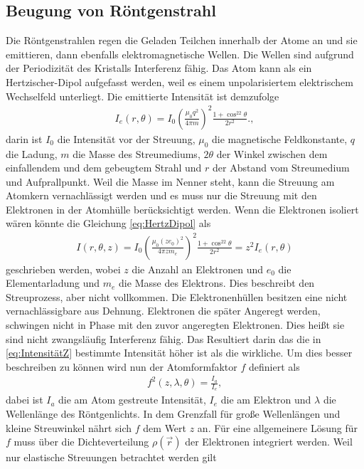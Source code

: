 \subsection{Beugung von Röntgenstrahl}
Die Röntgenstrahlen regen die Geladen Teilchen innerhalb der Atome an und sie emittieren, dann ebenfalls elektromagnetische Wellen. Die Wellen sind aufgrund der Periodizität des Kristalls Interferenz fähig. Das Atom kann als ein Hertzischer-Dipol aufgefasst werden, weil es einem unpolarisiertem elektrischem Wechselfeld unterliegt. Die emittierte Intensität ist demzufolge
\begin{align}
	I_e(r,\theta)=I_0\left(\frac{\mu_0q^2}{4\pi m}\right)^2\frac{1+\cos^22\theta}{2r^2}. \label{eq:HertzDipol},
\end{align}
darin ist $I_0$ die Intensität vor der Streuung, $\mu_0$ die magnetische Feldkonstante, $q$ die Ladung, $m$ die Masse des Streumediums, $2\theta$ der Winkel zwischen dem einfallendem und dem gebeugtem Strahl und $r$ der Abstand vom Streumedium und Aufprallpunkt.
Weil die Masse im Nenner steht, kann die Streuung am Atomkern vernachlässigt werden und es muss nur die Streuung mit den Elektronen in der Atomhülle berücksichtigt werden. Wenn die Elektronen isoliert wären könnte die Gleichung \eqref{eq:HertzDipol} als
\begin{align}
	I\left(r,\theta,z\right)=I_0\left(\frac{\mu_0(ze_0)^2}{4\pi zm_e}\right)^2\frac{1+\cos^22\theta}{2r^2}=z^2I_e\left(r,\theta\right)\label{eq:IntensitätZ}
\end{align}
geschrieben werden, wobei $z$ die Anzahl an Elektronen und $e_0$ die Elementarladung und $m_e$ die Masse des Elektrons. Dies beschreibt den Streuprozess, aber nicht vollkommen. Die Elektronenhüllen besitzen eine nicht vernachlässigbare aus Dehnung. Elektronen die später Angeregt werden, schwingen nicht in Phase mit den zuvor angeregten Elektronen. Dies heißt sie sind nicht zwangsläufig Interferenz fähig. Das Resultiert darin das die in \eqref{eq:IntensitätZ} bestimmte Intensität höher ist als die wirkliche. Um dies besser beschreiben zu können wird nun der Atomformfaktor $f$ definiert als
\begin{align}
	f^2\left(z,\lambda,\theta\right)=\frac{I_a}{I_e},
\end{align}
dabei ist $I_a$ die am Atom gestreute Intensität, $I_e$ die am Elektron und $\lambda$ die Wellenlänge des Röntgenlichts. In dem Grenzfall für große Wellenlängen und kleine Streuwinkel nährt sich $f$ dem Wert $z$ an. Für eine allgemeinere Lösung für $f$ muss über die Dichteverteilung $\rho (\vec{r})$ der Elektronen integriert werden. Weil nur elastische Streuungen betrachtet werden gilt 
